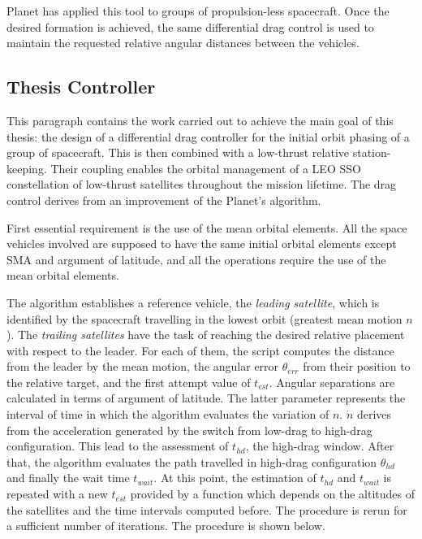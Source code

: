 Planet has applied this tool to groups of propulsion-less spacecraft.
Once the desired formation is achieved, the same differential drag control is used to maintain the requested relative angular distances between the vehicles.



\subsection{Thesis Controller}
This paragraph contains the work carried out to achieve the main goal of this thesis: the design of a differential drag controller for the initial orbit phasing of a group of spacecraft.
This is then combined with a low-thrust relative station-keeping.
Their coupling enables the orbital management of a LEO SSO constellation of low-thrust satellites throughout the mission lifetime. 
The drag control derives from an improvement of the Planet's algorithm.

First essential requirement is the use of the mean orbital elements.
All the space vehicles involved are supposed to have the same initial orbital elements except SMA and argument of latitude, and all the operations require the use of the mean orbital elements.

The algorithm establishes a reference vehicle, the \textit{leading satellite}, which is identified by the spacecraft travelling in the lowest orbit (greatest mean motion $n$).
The \textit{trailing satellites} have the task of reaching the desired relative placement with respect to the leader.
For each of them, the script computes the distance from the leader by the mean motion, the angular error $\theta_{err}$ from their position to the relative target, and the first attempt value of $t_{est}$.
Angular separations are calculated in terms of argument of latitude.
The latter parameter represents the interval of time in which the algorithm evaluates the variation of $n$.
$\dot{n}$ derives from the acceleration generated by the switch from low-drag to high-drag configuration.
This lead to the assessment of $t_{hd}$, the high-drag window.
After that, the algorithm evaluates the path travelled in high-drag configuration $\theta_{hd}$ and finally the wait time $t_{wait}.$ 
At this point, the estimation of $t_{hd}$ and $t_{wait}$ is repeated with a new $t_{est}$ provided by a function which depends on the altitudes of the satellites and the time intervals computed before.
The procedure is rerun for a sufficient number of iterations.
The procedure is shown below.

